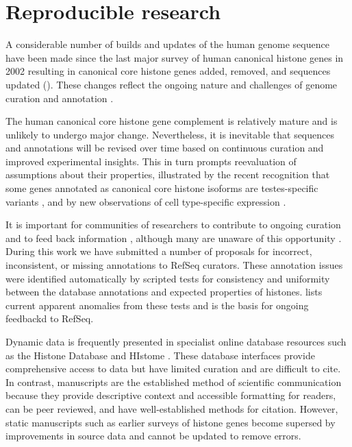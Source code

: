 \section{Reproducible research}
\label{sec:reproducible}

  A considerable number of builds and updates of the human genome sequence have been made
  since the last major survey of human canonical histone genes in 2002 \citep{Marzluff02}
  resulting in
  \AddedSinceReference{} canonical core histone genes added,
  \RemovedSinceReference{} removed,
  and \SequencesUpdatedSinceReference{}
  sequences updated ().
  These changes reflect the ongoing nature and challenges of
  genome curation and annotation \citep{BorkKoonin1998}.

  The human canonical core histone gene complement is relatively mature
  and is unlikely to undergo major change.
  Nevertheless, it is inevitable that sequences and annotations will be revised over time
  based on continuous curation and improved experimental insights.
  This in turn prompts reevaluation of assumptions about their properties,
  illustrated by the recent recognition that some genes 
  annotated as canonical core histone isoforms are testes-specific variants \citep{Talbert2012},
  and by new observations of cell type-specific expression \citep{Molden2015}.

  It is important for communities of researchers to contribute
  to ongoing curation and to feed back information \citep{SteinNRG2001},
  although many are unaware of this opportunity \citep{HollidaySPR2015}.
  During this work we have submitted a number of proposals 
  for incorrect, inconsistent, or missing annotations to RefSeq curators.
  These annotation issues were identified automatically
  by scripted tests for consistency and uniformity 
  between the database annotations and expected properties of histones.
   lists current apparent anomalies from these tests
  and is the basis for ongoing feedbackd to RefSeq.

  Dynamic data is frequently presented in specialist online database resources
  such as the Histone Database \citep{HistoneDB2016} and HIstome \citep{HIstome2012}.
  These database interfaces provide comprehensive access to data
  but have limited curation and are difficult to cite.
  In contrast, manuscripts are the established method of scientific communication
  because they provide descriptive context and accessible formatting for readers, 
  can be peer reviewed, and have well-established methods for citation.
  However, static manuscripts such as earlier surveys of histone genes \citep{AlbigHumangen1997,Marzluff02}
  become supersed by improvements in source data and cannot be updated to remove errors.

